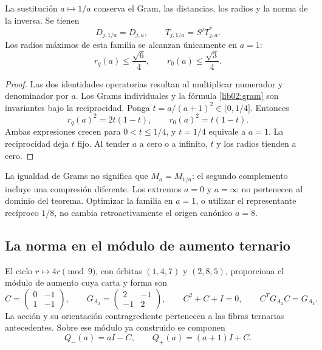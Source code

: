 \begin{proposition}
\label{lib02:dualidad-a}
La sustitución \(a\mapsto1/a\) conserva el Gram, las distancias,
los radios y la norma de la inversa. Se tienen
\[
 D_{j,1/a}=D_{j,a},\qquad
 T_{j,1/a}=S^jT_{j,a}^*.
\]
Los radios máximos de esta familia se alcanzan únicamente en \(a=1\):
\[
 r_q(a)\leq\frac{\sqrt6}{4},\qquad
 r_0(a)\leq\frac{\sqrt3}{4}.
\]
\end{proposition}
\begin{proof}
Las dos identidades operatorias resultan al multiplicar numerador y
denominador por \(a\). Los Grams individuales y la fórmula
\eqref{lib02:gram} son invariantes bajo la reciprocidad. Ponga
\(t=a/(a+1)^2\in(0,1/4]\). Entonces
\[
 r_q(a)^2=2t(1-t),\qquad r_0(a)^2=t(1-t).
\]
Ambas expresiones crecen para \(0<t\leq1/4\), y \(t=1/4\)
equivale a \(a=1\). La reciprocidad deja \(t\) fijo. Al tender
\(a\) a cero o a infinito, \(t\) y los radios tienden a cero.
\end{proof}

La igualdad de Grams no significa que \(M_a=M_{1/a}\): el segundo
complemento incluye una compresión diferente. Los extremos \(a=0\)
y \(a=\infty\) no pertenecen al dominio del teorema. Optimizar la
familia en \(a=1\), o utilizar el representante recíproco \(1/8\),
no cambia retroactivamente el origen canónico \(a=8\).

\subsection{La norma en el módulo de aumento ternario}
\label{lib02:modulo-ternario}

El ciclo \(r\mapsto4r\pmod9\), con órbitas \((1,4,7)\) y
\((2,8,5)\), proporciona el módulo de aumento cuya carta y forma son
\[
 C=\begin{pmatrix}0&-1\\1&-1\end{pmatrix},\qquad
 G_{A_2}=\begin{pmatrix}2&-1\\-1&2\end{pmatrix},\qquad
 C^2+C+I=0,\qquad C^TG_{A_2}C=G_{A_2}.
\]
La acción y su orientación contragrediente pertenecen a las fibras
ternarias antecedentes. Sobre ese módulo ya construido se componen
\[
 Q_-(a)=aI-C,\qquad Q_+(a)=(a+1)I+C.
\]

